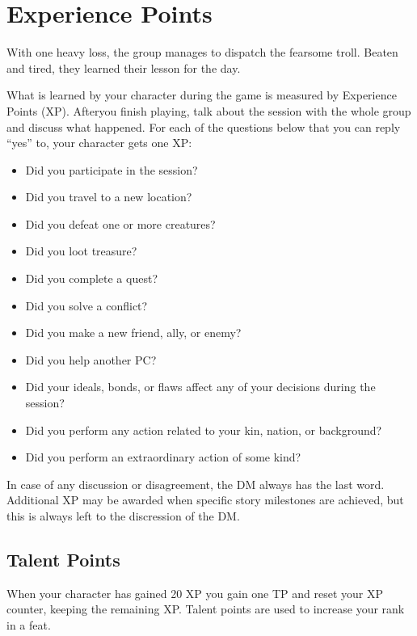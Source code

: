 \section{Experience Points}
With one heavy loss, the group manages to dispatch the fearsome troll.
Beaten and tired, they learned their lesson for the day.

What is learned by your character during the game is measured by Experience Points (XP).
Afteryou finish playing, talk about the session with the whole group and discuss what happened.
For each of the questions below that you can reply ``yes'' to, your character gets one XP:

\begin{itemize}
    \item Did you participate in the session?
    \item Did you travel to a new location?
    \item Did you defeat one or more creatures?
    \item Did you loot treasure?
    \item Did you complete a quest?
    \item Did you solve a conflict?
    \item Did you make a new friend, ally, or enemy?
    \item Did you help another PC?
    \item Did your ideals, bonds, or flaws affect any of your decisions during the session?
    \item Did you perform any action related to your kin, nation, or background?
    \item Did you perform an extraordinary action of some kind?
\end{itemize}

In case of any discussion or disagreement, the DM always has the last word.
Additional XP may be awarded when specific story milestones are achieved, but this is always left to the discression of the DM.

\subsection*{Talent Points}
When your character has gained 20 XP you gain one TP and reset your XP counter, keeping the remaining XP.
Talent points are used to increase your rank in a feat.

